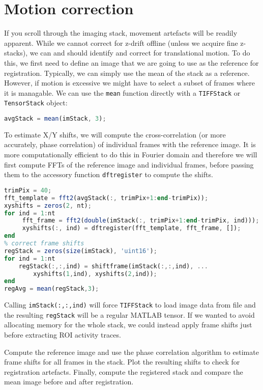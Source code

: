 \documentclass[a4paper]{report}
\newcommand{\nexercise}[0]{\arabic{exercises}\addtocounter{exercises}{1}}
\begin{document}
\section{Motion correction}
If you scroll through the imaging stack, movement artefacts will be readily apparent.
While we cannot correct for z-drift offline (unless we acquire fine z-stacks), we can and should identify and correct for translational motion. 
To do this, we first need to define an image that we are going to use as the reference for registration.
Typically, we can simply use the mean of the stack as a reference.
However, if motion is excessive we might have to select a subset of frames where it is managable.
We can use the \texttt{mean} function directly with a \texttt{TIFFStack} or \texttt{TensorStack} object:
\begin{lstlisting}[language=Octave]
avgStack = mean(imStack, 3);
\end{lstlisting}

To estimate X/Y shifts, we will compute the cross-correlation (or more accurately, phase correlation) of individual frames with the reference image.
It is more computationally efficient to do this in Fourier domain and therefore we will first compute FFTs of the reference image and individual frames, before passing them to the accessory function \texttt{dftregister} to compute the shifts.
\begin{lstlisting}[language=Octave]
% cropping the images to avoid the visual stimulation artefacts on the edge
trimPix = 40;
fft_template = fft2(avgStack(:, trimPix+1:end-trimPix));
xyshifts = zeros(2, nt);
for ind = 1:nt
     fft_frame = fft2(double(imStack(:, trimPix+1:end-trimPix, ind)));
     xyshifts(:, ind) = dftregister(fft_template, fft_frame, []);
end
% correct frame shifts
regStack = zeros(size(imStack), 'uint16');
for ind = 1:nt
    regStack(:,:,ind) = shiftframe(imStack(:,:,ind), ...
        xyshifts(1,ind), xyshifts(2,ind));
end
regAvg = mean(regStack,3);
\end{lstlisting}
Calling \texttt{imStack(:,:,ind)} will force \texttt{TIFFStack} to load image data from file and the resulting \texttt{regStack} will be a regular MATLAB tensor. 
If we wanted to avoid allocating memory for the whole stack, we could instead apply frame shifts just before extracting ROI activity traces.

\begin{exercisebox}[frametitle={Exercise \nexercise: Motion correction}]
Compute the reference image and use the phase correlation algorithm to estimate frame shifts for all frames in the stack.
Plot the resulting shifts to check for registration artefacts.
Finally, compute the registered stack and compare the mean image before and after registration.
\end{exercisebox}
\end{document}
